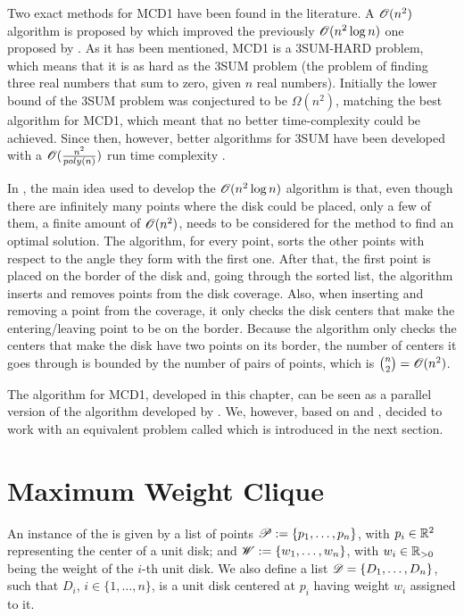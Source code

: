 Two exact methods for MCD1 have been found in the literature. A $\mathscr{O}(n^2)$ algorithm is proposed by  which improved the previously $\mathscr{O}(n^2\log{n})$ one proposed by .
As it has been mentioned, MCD1 is a 3SUM-HARD problem, which means that it is as hard as the 3SUM problem (the problem of finding three real numbers that sum to zero, given $n$ real numbers). Initially the lower bound of the 3SUM problem was conjectured to be $\Omega(n^2)$, matching the best algorithm for MCD1, which meant that no better time-complexity could be achieved. Since then, however, better algorithms for 3SUM have been developed with a $\mathscr{O}(\frac{n^2}{poly(n)})$ run time complexity \cite{3SUM-kopelowitz:2014}.


In , the main idea used to develop the $\mathscr{O}(n^2\log{n})$ algorithm is that, even though there are infinitely many points where the disk could be placed, only a few of them, a finite amount of $\mathscr{O}(n^2)$, needs to be considered for the method to find an optimal solution.
The algorithm, for every point, sorts the other points with respect to the angle they form with the first one. After that, the first point is placed on the border of the disk and, going through the sorted list, the algorithm inserts and removes points from the disk coverage. Also, when inserting and removing a point from the coverage, it only checks the disk centers that make the entering/leaving point to be on the border. Because the algorithm only checks the centers that make the disk have two points on its border, the number of centers it goes through is bounded by the number of pairs of points, which is $\binom{n}{2} = \mathscr{O}(n^2)$.

The algorithm for MCD1, developed in this chapter, can be seen as a parallel version of the algorithm developed by .
We, however, based on  and , decided to work with an equivalent problem called  which is introduced in the next section.

\section{Maximum Weight Clique}

An instance of the  is given by a list of points \mbox{$\mathscr{P}:=\{p_1,\dots,p_n\}$}, with $p_i \in \mathbb{R}^2$ representing the center of a unit disk;  and \mbox{$\mathscr{W}:=\{w_1, \dots, w_n\}$}, with $w_i\in \mathbb{R}_{>0}$ being the weight of the $i$-th unit disk. We also define a list $\mathscr{D}=\{D_1, \dots, D_n\}$, such that $D_i$, $i\in\{1,\dots,n\}$, is a unit disk centered at $p_i$ having weight $w_i$ assigned to it.

